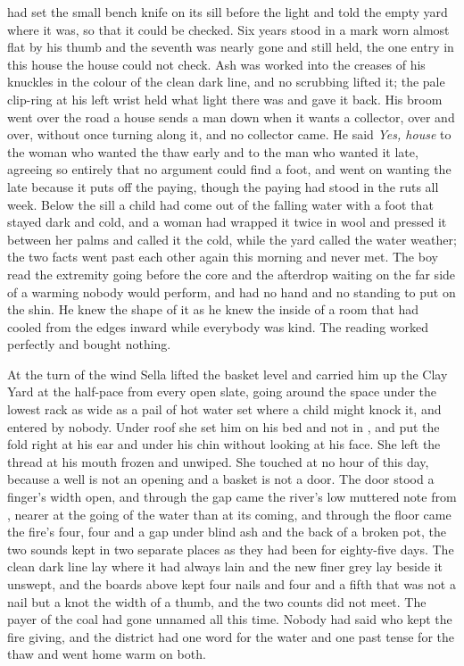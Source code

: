 \scenebreak

 had set the small bench knife on its sill before the light and told the empty yard where it was, so that it could be checked. Six years stood in a mark worn almost flat by his thumb and the seventh was nearly gone and still held, the one entry in this house the house could not check. Ash was worked into the creases of his knuckles in the colour of the clean dark line, and no scrubbing lifted it; the pale clip-ring at his left wrist held what light there was and gave it back. His broom went over the road a house sends a man down when it wants a collector, over and over, without once turning along it, and no collector came. He said \emph{Yes, house} to the woman who wanted the thaw early and to the man who wanted it late, agreeing so entirely that no argument could find a foot, and went on wanting the late because it puts off the paying, though the paying had stood in the ruts all week. Below the sill a child had come out of the falling water with a foot that stayed dark and cold, and a woman had wrapped it twice in wool and pressed it between her palms and called it the cold, while the yard called the water weather; the two facts went past each other again this morning and never met. The boy read the extremity going before the core and the afterdrop waiting on the far side of a warming nobody would perform, and had no hand and no standing to put on the shin. He knew the shape of it as he knew the inside of a room that had cooled from the edges inward while everybody was kind. The reading worked perfectly and bought nothing.

\scenebreak

At the turn of the wind Sella lifted the basket level and carried him up the Clay Yard at the half-pace from every open slate, going around the space under the lowest rack as wide as a pail of hot water set where a child might knock it, and entered by nobody. Under  roof she set him on his bed and not in , and put the fold right at his ear and under his chin without looking at his face. She left the thread at his mouth frozen and unwiped. She touched  at no hour of this day, because a well is not an opening and a basket is not a door. The door stood a finger's width open, and through the gap came the river's low muttered note from , nearer at the going of the water than at its coming, and through the floor came the fire's four, four and a gap under blind ash and the back of a broken pot, the two sounds kept in two separate places as they had been for eighty-five days. The clean dark line lay where it had always lain and the new finer grey lay beside it unswept, and the boards above kept four nails and four and a fifth that was not a nail but a knot the width of a thumb, and the two counts did not meet. The payer of the coal had gone unnamed all this time. Nobody had said who kept the fire giving, and the district had one word for the water and one past tense for the thaw and went home warm on both.


